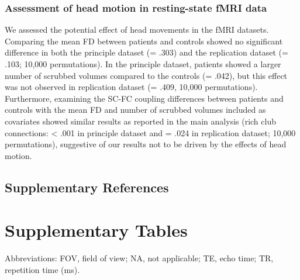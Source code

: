 \begin{refsection}
\subsubsection{Assessment of head motion in resting-state fMRI data}
We assessed the potential effect of head movements in the fMRI datasets. Comparing the mean FD between patients and controls showed no significant difference in both the principle dataset (\pval = .303) and the replication dataset (\pval = .103; 10,000 permutations). In the principle dataset, patients showed a larger number of scrubbed volumes compared to the controls (\pval = .042), but this effect was not observed in replication dataset (\pval = .409, 10,000 permutations). Furthermore, examining the SC-FC coupling differences between patients and controls with the mean FD and number of scrubbed volumes included as covariates showed similar results as reported in the main analysis (rich club connections: \pval < .001 in principle dataset and \pval = .024 in replication dataset; 10,000 permutations), suggestive of our results not to be driven by the effects of head motion.

\subsection*{Supplementary References}
\printbibliography[heading=none]

\newpage
\section*{Supplementary Tables}

\scriptsize
{} \label{tableS1:MRI} 
\bigskip
\scriptsize Abbreviations: FOV, field of view; NA, not applicable; TE, echo time; TR, repetition time (ms).


\end{refsection}

